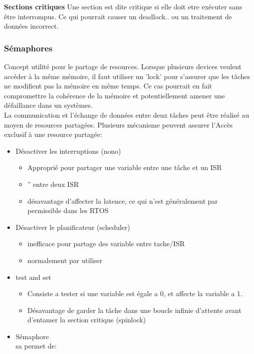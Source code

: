 \documentclass[oneside]{book}
\begin{document}
    \textbf{Sections critiques}
    Une section est dite critique si elle doit etre exécuter sans être interrompus. Ce qui pourrait causer un deadlock.. ou un traitement de données incorrect.
    
    \subsubsection{Sémaphores}
    Concept utilité pour le partage de resources. Lorsque plusieurs devices veulent accéder à la même mémoire, il faut utiliser un 'lock' pour s'assurer que les tâches ne modifient pas la mémoire en même temps. Ce cas pourrait en fait compromettre la cohérence de la mémoire et potentiellement amener une défaillance dans un systèmes.\\
    
    La communication et l'échange de données entre deux tâches peut être réalisé au moyen de resources partagées. Plusieurs mécanisme peuvent assurer l'Accès exclusif à une resource partagée:
    \begin{itemize}
        \item Désactiver les interruptions (nono)
        \begin{itemize}
            \item Approprié pour partager une variable entre une tâche et un ISR
            \item '' entre deux ISR
            \item désavantage d'affecter la latence, ce qui n'est généralement par permissible dans les RTOS
        \end{itemize}
        \item Désactiver le planificateur (scheduler)
        \begin{itemize}
            \item inefficace pour partage des variable entre tache/ISR
            \item normalement par utiliser
        \end{itemize}
        \item test and set
        \begin{itemize}
            \item Consiste a tester si une variable est égale a 0, et affecte la variable a 1.
            \item Désavantage de garder la tâche dans une boucle infinie d'attente avant d'entamer la section critique (spinlock)
        \end{itemize}
        \item Sémaphore\\
        sa permet de:
      
    \end{itemize}
\end{document}
